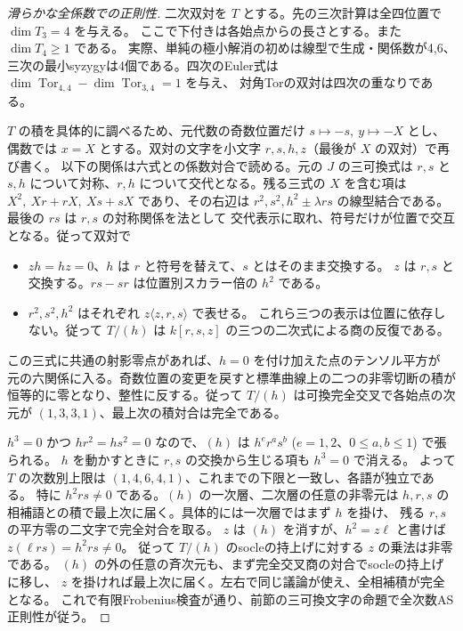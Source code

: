 \begin{proof}[滑らかな全係数での正則性]
二次双対を $T$ とする。先の三次計算は全四位置で $\dim T_3=4$ を与える。
ここで下付きは各始点からの長さとする。また $\dim T_4\ge1$ である。
実際、単純の極小解消の初めは線型で生成・関係数が4,6、
三次の最小syzygyは4個である。四次のEuler式は
$\dim\operatorname{Tor}_{4,4}-\dim\operatorname{Tor}_{3,4}=1$ を与え、
対角Torの双対は四次の重なりである。

$T$ の積を具体的に調べるため、元代数の奇数位置だけ $s\mapsto-s,\ y\mapsto-X$ とし、
偶数では $x=X$ とする。双対の文字を小文字 $r,s,h,z$（最後が $X$ の双対）で再び書く。
以下の関係は六式との係数対合で読める。元の $J$ の三可換式は
$r,s$ と $s,h$ について対称、$r,h$ について交代となる。残る三式の
$X$ を含む項は $X^2,\ Xr+rX,\ Xs+sX$ であり、その右辺は
$r^2,s^2,h^2\pm\lambda rs$ の線型結合である。最後の $rs$ は $r,s$ の対称関係を法として
交代表示に取れ、符号だけが位置で交互となる。従って双対で
\begin{itemize}
\item $zh=hz=0$、$h$ は $r$ と符号を替えて、$s$ とはそのまま交換する。
$z$ は $r,s$ と交換する。$rs-sr$ は位置別スカラー倍の $h^2$ である。
\item $r^2,s^2,h^2$ はそれぞれ $z\langle z,r,s\rangle$ で表せる。
これら三つの表示は位置に依存しない。従って $T/(h)$ は
$k[r,s,z]$ の三つの二次式による商の反復である。
\end{itemize}
この三式に共通の射影零点があれば、$h=0$ を付け加えた点のテンソル平方が
元の六関係に入る。奇数位置の変更を戻すと標準曲線上の二つの非零切断の積が
恒等的に零となり、整性に反する。従って $T/(h)$ は可換完全交叉で各始点の次元が
$(1,3,3,1)$、最上次の積対合は完全である。

$h^3=0$ かつ $hr^2=hs^2=0$ なので、$(h)$ は
$h^e r^a s^b$ ($e=1,2$、$0\le a,b\le1$) で張られる。
$h$ を動かすときに $r,s$ の交換から生じる項も $h^3=0$ で消える。
よって $T$ の次数別上限は $(1,4,6,4,1)$、これまでの下限と一致し、各語が独立である。
特に $h^2rs\ne0$ である。$(h)$ の一次層、二次層の任意の非零元は
$h,r,s$ の相補語との積で最上次に届く。具体的には一次層ではまず $h$ を掛け、
残る $r,s$ の平方零の二文字で完全対合を取る。
$z$ は $(h)$ を消すが、$h^2=z\ell$ と書けば $z(\ell rs)=h^2rs\ne0$。
従って $T/(h)$ のsocleの持上げに対する $z$ の乗法は非零である。
$(h)$ の外の任意の斉次元も、まず完全交叉商の対合でsocleの持上げに移し、
$z$ を掛ければ最上次に届く。左右で同じ議論が使え、全相補積が完全となる。
これで有限Frobenius検査が通り、前節の三可換文字の命題で全次数AS正則性が従う。
\end{proof}

